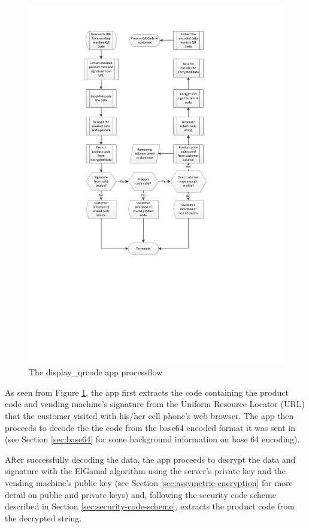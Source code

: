 \begin{figure}[h]
 \centering 
 \includegraphics[clip=true, trim = 0 250 0 50,
 scale=0.7]{qrcode_processflow_server_bak}
 \caption{The display\_qrcode app processflow}
 \label{fig:disp-qrcode}
\end{figure}

As seen from Figure \ref{fig:disp-qrcode}, the app first extracts the code containing the
product code and vending machine's signature from the Uniform Resource Locator (URL) that the
customer visited with his/her cell phone's web browser. The app then proceeds to decode the
the code from the base64 encoded format it was sent in (see Section \ref{sec:base64} for some
background information on base 64 encoding).

After successfully decoding the data, the app proceeds to decrypt the data and signature with the ElGamal
algorithm using the server's private key and the vending machine's public key
(see Section \ref{sec:assymetric-encryption} for more detail on public and private keys) and, following the
security code scheme described in Section \ref{sec:security-code-scheme}, extracts the product
code from the decrypted string.

